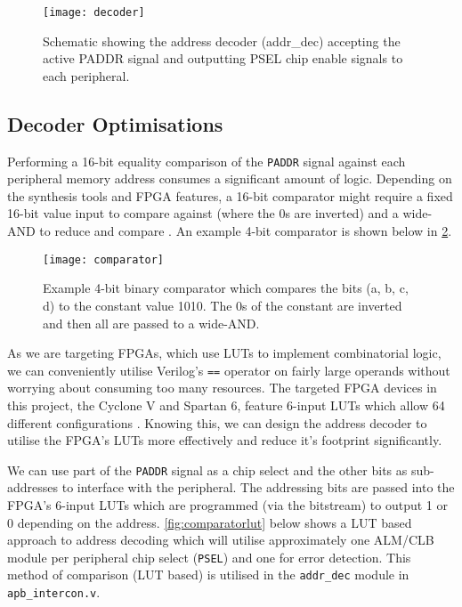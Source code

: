\begin{figure}[H]
\centering
\texttt{[image: decoder]}
\caption{Schematic showing the address decoder (addr\_dec) accepting the active PADDR signal and outputting PSEL chip enable signals to each peripheral.}
\label{fig:decoder}
\end{figure}

\subsection{Decoder Optimisations}
Performing a 16-bit equality comparison of the \verb|PADDR| signal against each peripheral memory address consumes a significant amount of logic. Depending on the synthesis tools and FPGA features, a 16-bit comparator might require a fixed 16-bit value input to compare against (where the 0s are inverted) and a wide-AND to reduce and compare \cite{palchaudhuri2015high,salauyou2015designing}. An example 4-bit comparator is shown below in \cref{fig:comparator}.

\begin{figure}[H]
\centering
\texttt{[image: comparator]}
\caption{Example 4-bit binary comparator which compares the bits (a, b, c, d) to the constant value 1010. The 0s of the constant are inverted and then all are passed to a wide-AND.}
\label{fig:comparator}
\end{figure}

As we are targeting FPGAs, which use LUTs to implement combinatorial logic, we can conveniently utilise Verilog's \verb|==| operator on fairly large operands without worrying about consuming too many resources. The targeted FPGA devices in this project, the Cyclone V and Spartan 6, feature 6-input LUTs which allow 64 different configurations \cite{s6clb, cvclb}. Knowing this, we can design the address decoder to utilise the FPGA's LUTs more effectively and reduce it's footprint significantly.

We can use part of the \verb|PADDR| signal as a chip select and the other bits as sub-addresses to interface with the peripheral. The addressing bits are passed into the FPGA's 6-input LUTs which are programmed (via the bitstream) to output 1 or 0 depending on the address. \cref{fig:comparatorlut} below shows a LUT based approach to address decoding which will utilise approximately one ALM/CLB module per peripheral chip select (\verb|PSEL|) and one for error detection. This method of comparison (LUT based) is utilised in the \verb|addr_dec| module in \verb|apb_intercon.v|.

